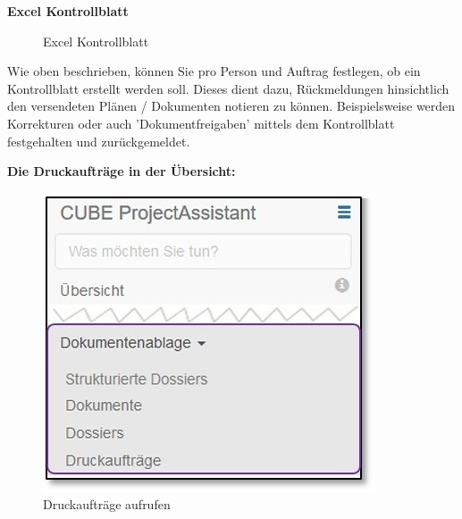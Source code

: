 \vspace{\baselineskip}

\textbf{Excel Kontrollblatt}\\

\begin{figure}[H]
\caption{Excel Kontrollblatt}
\end{figure}

Wie oben beschrieben, können Sie pro Person und Auftrag festlegen, ob ein Kontrollblatt erstellt werden soll. Dieses dient dazu, Rückmeldungen hinsichtlich den versendeten Plänen / Dokumenten notieren zu können. Beispielsweise werden Korrekturen oder auch 'Dokumentfreigaben' mittels dem Kontrollblatt festgehalten und zurückgemeldet.

\pagebreak
\textbf{Die Druckaufträge in der Übersicht:}\\

\begin{figure}   %
  \vspace{-35pt}      %
  \begin{center}
    \includegraphics[width=1\linewidth]{../chapters/11_Dokumentenablage/pictures/11_Menu_Dokumentenablage_s.jpg}
  \end{center}
  \vspace{-20pt}
  \caption{Druckaufträge aufrufen}
  \vspace{-10pt}
\end{figure}

